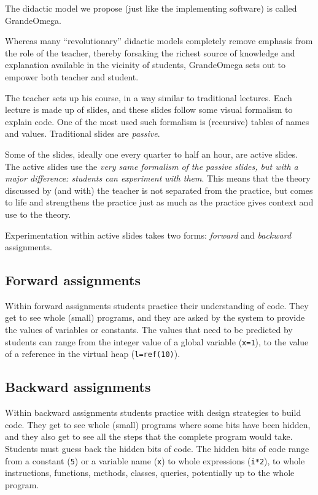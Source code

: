 The didactic model we propose (just like the implementing software) is called GrandeOmega.

Whereas many “revolutionary” didactic models completely remove emphasis from the role of the teacher, thereby forsaking the richest source of knowledge and explanation available in the vicinity of students, GrandeOmega sets out to empower both teacher and student. 

The teacher sets up his course, in a way similar to traditional lectures. Each lecture is made up of slides, and these slides follow some visual formalism to explain code. One  of the most used such formalism is (recursive) tables of names and values. Traditional slides are \textit{passive}.

Some of the slides, ideally one every quarter to half an hour, are active slides. The active slides use the \textit{very same formalism of the passive slides, but with a major difference: students can experiment with them}. This means that the theory discussed by (and with) the teacher is not separated from the practice, but comes to life and strengthens the practice just as much as the practice gives context and use to the theory.

Experimentation within active slides takes two forms: \textit{forward} and \textit{backward} assignments.

\subsection{Forward assignments}
Within forward assignments students practice their understanding of code. They get to see whole (small) programs, and they are asked by the system to provide the values of variables or constants. The values that need to be predicted by students can range from the integer value of a global variable (\texttt{x=1}), to the value of a reference in the virtual heap (\texttt{l=ref(10)}).

\subsection{Backward assignments}
Within backward assignments students practice with design strategies to build code. They get to see whole (small) programs where some bits have been hidden, and they also get to see all the steps that the complete program would take. Students must guess back the hidden bits of code. The hidden bits of code range from a constant (\texttt{5}) or a variable name (\texttt{x}) to whole expressions (\texttt{i*2}), to whole instructions, functions, methods, classes, queries, potentially up to the whole program.

